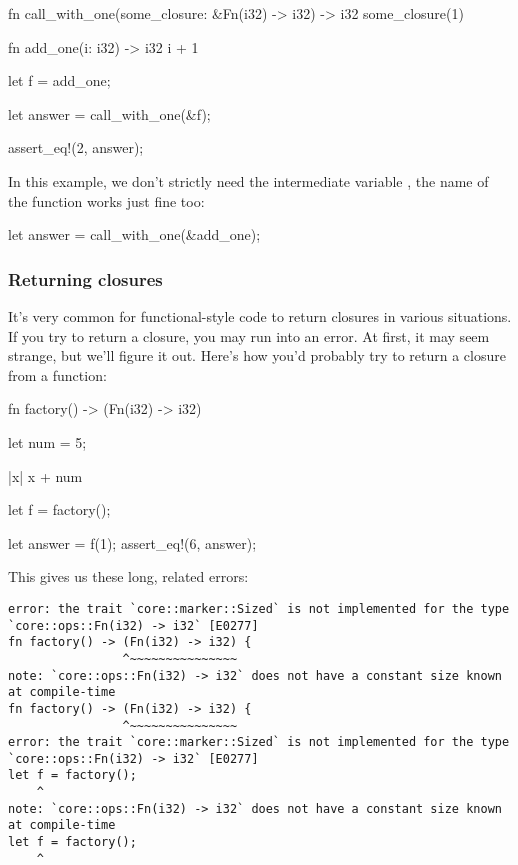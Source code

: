 \begin{rustc}
fn call_with_one(some_closure: &Fn(i32) -> i32) -> i32 {
    some_closure(1)
}

fn add_one(i: i32) -> i32 {
    i + 1
}

let f = add_one;

let answer = call_with_one(&f);

assert_eq!(2, answer);
\end{rustc}

In this example, we don't strictly need the intermediate variable , the name of the function works just fine too:

\begin{rustc}
let answer = call_with_one(&add_one);
\end{rustc}

\subsubsection*{Returning closures}

It's very common for functional-style code to return closures in various situations. If you try to return a closure, you may run 
into an error. At first, it may seem strange, but we'll figure it out. Here's how you'd probably try to return a closure from a 
function:

\begin{rustc}
fn factory() -> (Fn(i32) -> i32) {
    let num = 5;

    |x| x + num
}

let f = factory();

let answer = f(1);
assert_eq!(6, answer);
\end{rustc}

This gives us these long, related errors:

\begin{verbatim}
error: the trait `core::marker::Sized` is not implemented for the type
`core::ops::Fn(i32) -> i32` [E0277]
fn factory() -> (Fn(i32) -> i32) {
                ^~~~~~~~~~~~~~~~
note: `core::ops::Fn(i32) -> i32` does not have a constant size known at compile-time
fn factory() -> (Fn(i32) -> i32) {
                ^~~~~~~~~~~~~~~~
error: the trait `core::marker::Sized` is not implemented for the type `core::ops::Fn(i32) -> i32` [E0277]
let f = factory();
    ^
note: `core::ops::Fn(i32) -> i32` does not have a constant size known at compile-time
let f = factory();
    ^
\end{verbatim}

